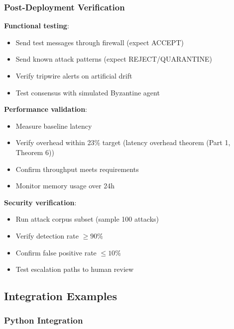 \documentclass[
]{article}
\begin{document}
\subsubsection{Post-Deployment Verification}\label{sec:post-deploy}

\textbf{Functional testing}:

\begin{itemize}
\item Send test messages through firewall (expect ACCEPT)
\item Send known attack patterns (expect REJECT/QUARANTINE)
\item Verify tripwire alerts on artificial drift
\item Test consensus with simulated Byzantine agent
\end{itemize}

\textbf{Performance validation}:

\begin{itemize}
\item Measure baseline latency
\item Verify overhead within 23\% target (latency overhead theorem (Part 1, Theorem 6))
\item Confirm throughput meets requirements
\item Monitor memory usage over 24h
\end{itemize}

\textbf{Security verification}:

\begin{itemize}
\item Run attack corpus subset (sample 100 attacks)
\item Verify detection rate $\geq 90\%$
\item Confirm false positive rate $\leq 10\%$
\item Test escalation paths to human review
\end{itemize}

\subsection{Integration Examples}\label{sec:integration-examples}

\subsubsection{Python Integration}\label{sec:python-integration}
\end{document}
